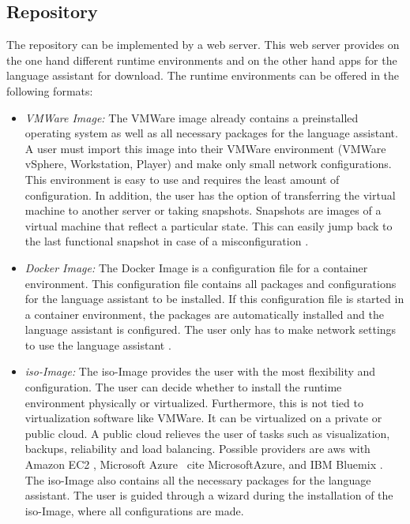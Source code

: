 \subsection{Repository}
The repository can be implemented by a web server. This web server provides on the one hand different runtime environments and on the other hand apps for the language assistant for download. The runtime environments can be offered in the following formats:
\begin{itemize}
	\item \textsl{VMWare Image:} The VMWare image already contains a preinstalled operating system as well as all necessary packages for the language assistant. A user must import this image into their VMWare environment (VMWare vSphere, Workstation, Player) and make only small network configurations. This environment is easy to use and requires the least amount of configuration. In addition, the user has the option of transferring the virtual machine to another server or taking snapshots. Snapshots are images of a virtual machine that reflect a particular state. This can easily jump back to the last functional snapshot in case of a misconfiguration \cite{VMWare}.
	\item \textsl{Docker Image:} The Docker Image is a configuration file for a container environment. This configuration file contains all packages and configurations for the language assistant to be installed. If this configuration file is started in a container environment, the packages are automatically installed and the language assistant is configured. The user only has to make network settings to use the language assistant \cite{Docker}.
	\item \textsl{\acs{iso}-Image:} The \acs{iso}-Image provides the user with the most flexibility and configuration. The user can decide whether to install the runtime environment physically or virtualized. Furthermore, this is not tied to virtualization software like VMWare. It can be virtualized on a private or public cloud. A public cloud relieves the user of tasks such as visualization, backups, reliability and load balancing. Possible providers are \ac{aws} with Amazon EC2 \cite{AWSAmazonEC2}, Microsoft Azure \ cite {MicrosoftAzure}, and IBM Bluemix \cite{IBMBluemix}. The \acs{iso}-Image also contains all the necessary packages for the language assistant. The user is guided through a wizard during the installation of the \acs{iso}-Image, where all configurations are made.
\end{itemize}

